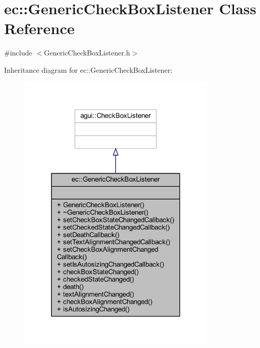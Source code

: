 \hypertarget{classec_1_1_generic_check_box_listener}{}\section{ec\+:\+:Generic\+Check\+Box\+Listener Class Reference}
\label{classec_1_1_generic_check_box_listener}


{\ttfamily \#include $<$Generic\+Check\+Box\+Listener.\+h$>$}



Inheritance diagram for ec\+:\+:Generic\+Check\+Box\+Listener\+:\nopagebreak
\begin{figure}[H]
\begin{center}
\leavevmode
\includegraphics[width=269pt]{classec_1_1_generic_check_box_listener__inherit__graph}
\end{center}
\end{figure}


